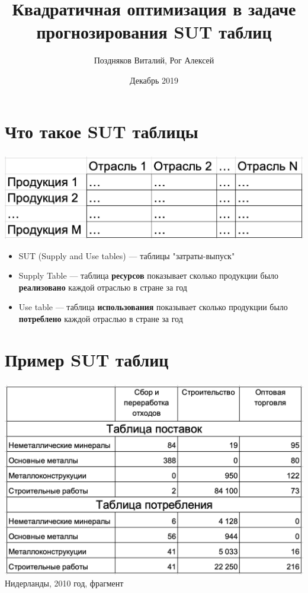 \documentclass{beamer}
\title{Квадратичная оптимизация в задаче прогнозирования SUT таблиц}
\author{Поздняков Виталий,  Рог Алексей}
\institute{Высшая школа экономики}
\date{Декабрь 2019}
\begin{document}
\begin{frame}
\titlepage
\end{frame}

\section{Что такое SUT таблицы}

\begin{frame}
	\frametitle{\insertsection}
	
	\includegraphics[width=\textwidth]{2019-12-07_12-18-36.png}
	
	\begin{itemize}
    \item SUT (Supply and Use tables) — таблицы "затраты-выпуск"
    \item Supply Table — таблица \textbf{ресурсов} показывает сколько продукции было \textbf{реализовано} каждой отраслью в стране за год
    \item Use table — таблица \textbf{использования} показывает сколько продукции было \textbf{потреблено} каждой отраслью в стране за год
    \end{itemize}
    
\end{frame}

\section{Пример SUT таблиц}
\begin{frame}
	\frametitle{\insertsection}
	
     \includegraphics[width=\textwidth]{2019-12-04_20-57-19.png}
     Нидерланды, 2010 год, фрагмент

\end{frame}
\end{document}

